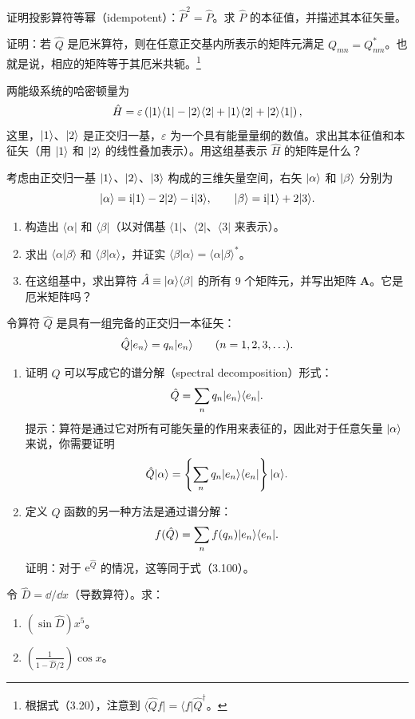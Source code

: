证明投影算符等幂（idempotent）：$\hat P^2=\hat P$。求 $\hat P$ 的本征值，并描述其本征矢量。
\vfill

证明：若 $\hat Q$ 是厄米算符，则在任意正交基内所表示的矩阵元满足 $Q_{mn}=Q_{nm}^*$。也就是说，相应的矩阵等于其厄米共轭。\footnote{根据式（3.20），注意到 $\langle\hat Qf|=\langle f|\hat Q^\dagger$。}
\vfill

两能级系统的哈密顿量为
\[
\hat H=\varepsilon\left(\lvert 1\rangle\langle1|-\lvert 2\rangle\langle2|
+\lvert 1\rangle\langle2|+\lvert 2\rangle\langle1|\right),
\]
这里，$\lvert 1\rangle$、$\lvert 2\rangle$ 是正交归一基，$\varepsilon$ 为一个具有能量量纲的数值。求出其本征值和本征矢（用 $\lvert 1\rangle$ 和 $\lvert 2\rangle$ 的线性叠加表示）。用这组基表示 $\hat H$ 的矩阵是什么？
\vfill

考虑由正交归一基 $\lvert 1\rangle$、$\lvert 2\rangle$、$\lvert 3\rangle$ 构成的三维矢量空间，右矢 $\lvert \alpha\rangle$ 和 $\lvert \beta\rangle$ 分别为
\[
\lvert \alpha\rangle=\mathrm{i}\lvert 1\rangle-2\lvert 2\rangle-\mathrm{i}\lvert 3\rangle,\qquad
\lvert \beta\rangle=\mathrm{i}\lvert 1\rangle+2\lvert 3\rangle.
\]
\begin{enumerate}
\item 构造出 $\langle\alpha|$ 和 $\langle\beta|$（以对偶基 $\langle1|$、$\langle2|$、$\langle3|$ 来表示）。
\item 求出 $\langle\alpha|\beta\rangle$ 和 $\langle\beta|\alpha\rangle$，并证实 $\langle\beta|\alpha\rangle=\langle\alpha|\beta\rangle^*$。
\item 在这组基中，求出算符 $\hat A\equiv\lvert \alpha\rangle\langle\beta|$ 的所有 9 个矩阵元，并写出矩阵 $\boldsymbol A$。它是厄米矩阵吗？
\end{enumerate}
\vfill

令算符 $\hat Q$ 是具有一组完备的正交归一本征矢：
\[
\hat Q\lvert e_n\rangle=q_n\lvert e_n\rangle\qquad(n=1,2,3,\ldots).
\]
\begin{enumerate}
\item 证明 $\hat Q$ 可以写成它的谱分解（spectral decomposition）形式：
\[
\hat Q=\sum_nq_n\lvert e_n\rangle\langle e_n|.
\]
提示：算符是通过它对所有可能矢量的作用来表征的，因此对于任意矢量 $\lvert \alpha\rangle$ 来说，你需要证明
\[
\hat Q\lvert \alpha\rangle
=\left\{\sum_nq_n\lvert e_n\rangle\langle e_n|\right\}\lvert \alpha\rangle.
\]
\item 定义 $\hat Q$ 函数的另一种方法是通过谱分解：
\[
f(\hat Q)=\sum_nf(q_n)\lvert e_n\rangle\langle e_n|.
\]
证明：对于 $\mathrm{e}^{\hat Q}$ 的情况，这等同于式（3.100）。
\end{enumerate}
\vfill

令 $\hat D=\dd/\dd x$（导数算符）。求：
\begin{enumerate}
\item $\displaystyle(\sin\hat D)x^5$。
\item $\displaystyle\left(\frac{1}{1-\hat D/2}\right)\cos x$。
\end{enumerate}
\vfill

